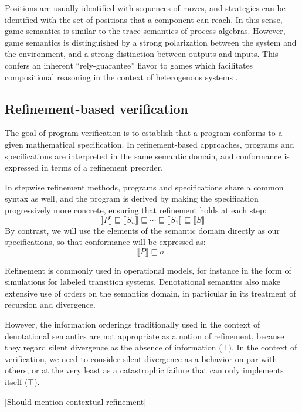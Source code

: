 \documentclass[acmsmall,timestamp,review]{acmart}
\begin{document}
Positions are usually identified with sequences of moves,
and strategies can be identified with the set of positions
that a component can reach.
In this sense,
game semantics is similar to
the trace semantics of process algebras.
However, game semantics is distinguished
by a strong polarization between
the system and the environment,
and a strong distinction between outputs and inputs.
This confers an inherent ``rely-guarantee'' flavor
to games which facilitates compositional reasoning
in the context of heterogenous systems \cite{cspgs}.


\subsection{Refinement-based verification} %

The goal of program verification
is to establish that a program conforms
to a given mathematical specification.
In refinement-based approaches,
programs and specifications are interpreted in the same
semantic domain,
and conformance is expressed in terms of a
refinement preorder.

In stepwise refinement methods,
programs and specifications share a common syntax as well,
and the program is derived
by making the specification progressively more concrete,
ensuring that refinement holds at each step:
\[ \llbracket P \rrbracket \sqsubseteq
   \llbracket S_n \rrbracket \sqsubseteq
   \cdots \sqsubseteq
   \llbracket S_1 \rrbracket \sqsubseteq
   \llbracket S \rrbracket \]
By contrast,
we will use the elements of the semantic domain
directly as our specifications,
so that conformance will be expressed as:
\[ \llbracket P \rrbracket \sqsubseteq \sigma \,. \]

Refinement is commonly used in operational models,
for instance in the form of simulations
for labeled transition systems.
Denotational semantics also make extensive use of
orders on the semantics domain,
in particular in its treatment of recursion and divergence.

However,
the information orderings traditionally used
in the context of denotational semantics
are not appropriate as a notion of refinement,
because they regard silent divergence
as the absence of information ($\bot$).
In the context of verification,
we need to consider silent divergence
as a behavior on par with others,
or at the very least as a catastrophic failure
that can only implements itself ($\top$).

[Should mention contextual refinement]
\end{document}
